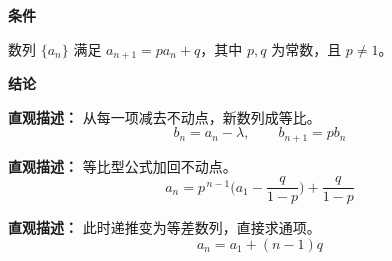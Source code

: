 \begin{statementbox}
	\textbf{\textcolor{CStatement}{条件}}
	\begin{description}[style=nextline, leftmargin=2.8em, labelsep=0.5em, itemsep=0.35em]
		\item[\textbf{\textcolor{CStatement}{条件 1（线性递推）：}}] 数列 $\{a_n\}$ 满足 $a_{n+1}=p a_n+q$，其中 $p,q$ 为常数，且 $p\neq 1$。
	\end{description}

	\textbf{\textcolor{CStatement}{结论}}
	\begin{description}[style=nextline, leftmargin=2.8em, labelsep=0.5em, itemsep=0.45em]
		\item[\textbf{\textcolor{CStatement}{结论一（构造等比）：}}]
			\textbf{\textcolor{CStatement}{直观描述：}}
			从每一项减去不动点，新数列成等比。
			\[
				b_n = a_n - \lambda,
				\qquad
				b_{n+1} = p b_n
			\]

		\item[\textbf{\textcolor{CStatement}{结论二（通项公式）：}}]
			\textbf{\textcolor{CStatement}{直观描述：}}
			等比型公式加回不动点。
			\[
				a_n = p^{\,n-1}\bigl(a_1-\frac{q}{1-p}\bigr)+\frac{q}{1-p}
			\]

		\item[\textbf{\textcolor{CStatement}{推广结论（$p=1$ 情况）：}}]
			\textbf{\textcolor{CStatement}{直观描述：}}
			此时递推变为等差数列，直接求通项。
			\[
				a_n = a_1 + (n-1)q
			\]
	\end{description}
\end{statementbox}
